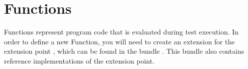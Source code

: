 \chapter{Functions}
\label{functions}

Functions represent program code that is evaluated during test execution. 
In order to define a new Function, you will need to create an extension for 
the extension point , which 
can be found in the bundle . This 
bundle also contains reference implementations of the extension point.
